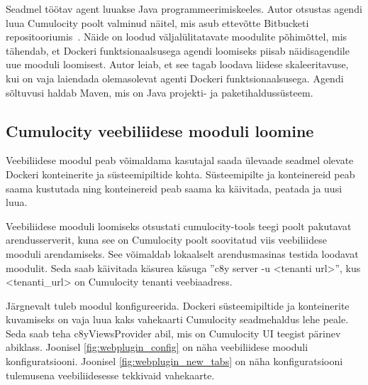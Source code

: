 \documentclass[12pt]{article}
\begin{document}
 Seadmel töötav agent luuakse Java programmeerimiskeeles. Autor otsustas agendi luua Cumulocity
 poolt valminud näitel, mis asub ettevõtte Bitbucketi repositooriumis~\cite{cumulocityExamplesRepository}.
 Näide on loodud
 väljalülitatavate moodulite põhimõttel, mis tähendab, et Dockeri funktsionaalsusega agendi
 loomiseks piisab näidisagendile uue mooduli loomisest. Autor leiab, et see tagab loodava liidese
 skaleeritavuse, kui on vaja laiendada olemasolevat agenti Dockeri funktsionaalsusega. Agendi
 sõltuvusi haldab Maven, mis on Java projekti- ja paketihaldussüsteem.
 

 



 \subsection{Cumulocity veebiliidese mooduli loomine}
 Veebiliidese moodul peab võimaldama kasutajal saada ülevaade seadmel olevate Dockeri
 konteinerite ja süsteemipiltide kohta. Süsteemipilte ja konteinereid peab saama kustutada
 ning konteinereid peab saama ka käivitada, peatada ja uusi luua.

 Veebiliidese mooduli loomiseks otsustati cumulocity-tools teegi poolt pakutavat arendusserverit,
 kuna see on Cumulocity poolt soovitatud viis veebiliidese mooduli arendamiseks.
 See võimaldab lokaalselt arendusmasinas testida loodavat moodulit. Seda saab käivitada
 käsurea käsuga ''c8y server -u <tenanti url>'', kus <tenanti\_url> on Cumulocity tenanti
 veebiaadress.

 Järgnevalt tuleb moodul konfigureerida. Dockeri süsteemipiltide ja konteinerite
 kuvamiseks on vaja luua kaks vahekaarti Cumulocity seadmehaldus lehe peale. Seda saab teha
 c8yViewsProvider abil, mis on Cumulocity UI teegist pärinev abiklass. Joonisel
 \ref{fig:webplugin_config} on näha veebiliidese mooduli konfiguratsiooni. Joonisel
 \ref{fig:webplugin_new_tabs}  on näha konfiguratsiooni tulemusena veebiliidesesse tekkivaid
 vahekaarte.
\end{document}
